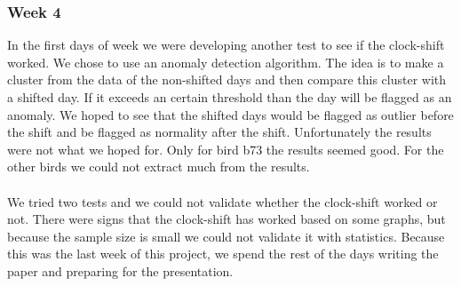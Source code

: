 \documentclass[a4paper]{article}
\begin{document}
\subsubsection*{Week 4}
In the first days of week we were developing another test to see if the clock-shift worked. We chose to use an anomaly detection algorithm. The idea is to make a cluster from the data of the non-shifted days and then compare this cluster with a shifted day. If it exceeds an certain threshold than the day will be flagged as an anomaly. We hoped to see that the shifted days would be flagged as outlier before the shift and  be flagged as normality after the shift. Unfortunately the results were not what we hoped for. Only for bird b73 the results seemed good. For the other birds we could not extract much from the results.\\\\ We tried two tests and we could not validate whether the clock-shift worked or not. There were signs that the clock-shift has worked based on some graphs, but because the sample size is small we could not validate it with statistics. Because this was the last week of this project, we spend the rest of the days writing the paper and preparing for the presentation. 
\end{document}
